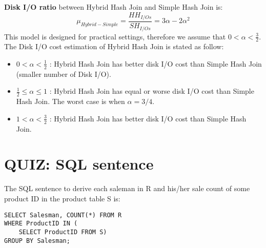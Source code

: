 \documentclass[a4paper,12pt]{article}
\begin{document}
\noindent
\textbf{Disk I/O ratio} between Hybrid Hash Join and Simple Hash Join is: $$ \mu_{Hybrid-Simple} = \frac{HH_{I/Os}}{SH_{I/Os}} = 3\alpha - 2\alpha^{2} $$
\noindent
This model is designed for practical settings, therefore we assume that $0 < \alpha < \frac{3}{2}$. The Disk I/O cost estimation of Hybrid Hash Join is stated as follow: 
\begin{itemize}
	\item $0 < \alpha < \frac{1}{2}$ : Hybrid Hash Join has better disk I/O cost than Simple Hash Join (smaller number of Disk I/O). 
	\item $\frac{1}{2} \leq \alpha \leq 1$ : Hybrid Hash Join has equal or worse disk I/O cost than Simple Hash Join. The worst case is when $\alpha = 3/4$.
	\item $1 < \alpha < \frac{3}{2}$ : Hybrid Hash Join has better disk I/O cost than Simple Hash Join.
\end{itemize}


\section{QUIZ: SQL sentence}

The SQL sentence to derive each saleman in R and his/her sale count of some product ID in the product table S is:

\begin{lstlisting}[label={list:first},SQL sentence to derive Saleman and number of sale]
SELECT Salesman, COUNT(*) FROM R 
WHERE ProductID IN (
	SELECT ProductID FROM S)
GROUP BY Salesman;
\end{lstlisting}
\end{document}
